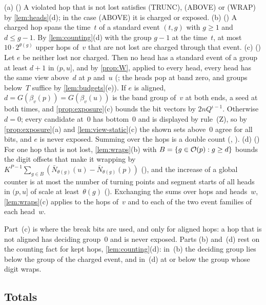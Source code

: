 \begin{outline}
(a) () A violated hop that is not lost satisfies (TRUNC), (ABOVE) or (WRAP) by \cref{lem:heads}(d); in
the case (ABOVE) it is charged or exposed. (b) () A charged hop spans the time~$t$ of a standard event
$(t,g)$ with $g\ge1$ and $d\le g-1$. By \cref{lem:counting}(d) with the group $g-1$ at the time~$t$, at most $10\cdot2^{\theta(g)}$
upper hops of~$v$ that are not lost are charged through that event. (c) () Let $e$ be neither lost nor
charged. Then no head has a standard event of a group at least $d+1$ in $(p,u]$, and by \cref{prop:W}, applied to every head, every
head has the same view above~$d$ at $p$ and~$u$ (; the heads pop at band zero, and groups below~$T$
suffice by \cref{lem:budgets}(e)). If $e$ is aligned, $d=G(\beta_v(p))=G(\beta_v(u))$ is the band group of~$v$ at both ends, a seed
at both times, and \cref{prop:exposure}(c) bounds the bit vectors by $2nQ^{\iota-1}$. Otherwise $d=0$; every candidate at~$0$ has
bottom~$0$ and is displayed by rule~(Z), so by \cref{prop:exposure}(a) and \cref{lem:view-static}(c) the shown sets above~$0$
agree for all bits, and $e$ is never exposed. Summing over the hops is a double count (,
). (d) () For one hop that is not lost, \cref{lem:wraps}(b) with
$B=\{g\in\mathcal{O}(p):g\ge d\}$ bounds the digit offsets that make it wrapping by
$K^{P-1}\sum_{g\in B}(\bar N_{\theta(g)}(u)-\bar N_{\theta(g)}(p))$ (), and the increase of a global
counter is at most the number of turning points and segment starts of all heads in $(p,u]$ of scale at least~$\theta(g)$
(). Exchanging the sums over hops and heads~$w$, \cref{lem:wraps}(c) applies to the hops of~$v$ and
to each of the two event families of each head~$w$.
\end{outline}

Part~(c) is where the break bits are used, and only for aligned hops: a hop that is not aligned has deciding group~$0$ and is never
exposed. Parts (b) and~(d) rest on the counting fact for kept hops, \cref{lem:counting}(d): in~(b) the deciding group lies below the
group of the charged event, and in~(d) at or below the group whose digit wraps.

\subsection{Totals}\label{sec:acc-totals}

